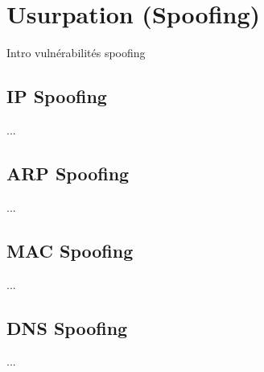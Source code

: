 

\section{Usurpation (Spoofing)}\label{vulnerabilites:reseau:spoofing}

Intro vulnérabilités spoofing

\subsection{IP Spoofing}\label{vulnerabilites:reseau:spoofing:ip}

...

\subsection{ARP Spoofing}\label{vulnerabilites:reseau:spoofing:arp}

...

\subsection{MAC Spoofing}\label{vulnerabilites:reseau:spoofing:mac}

...

\subsection{DNS Spoofing}\label{vulnerabilites:reseau:spoofing:dns}

...

\endinput
